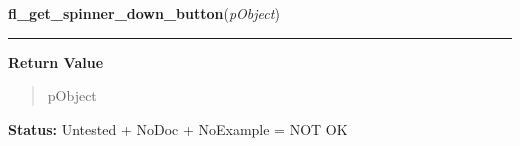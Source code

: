     \vspace{0.5ex}

\hspace{.8\funcindent}\begin{boxedminipage}{\funcwidth}

    \raggedright \textbf{fl\_get\_spinner\_down\_button}(\textit{pObject})

    \vspace{-1.5ex}

    \rule{\textwidth}{0.5\fboxrule}
\setlength{\parskip}{2ex}
\setlength{\parskip}{1ex}
      \textbf{Return Value}
    \vspace{-1ex}

      \begin{quote}
      pObject

      \end{quote}

\textbf{Status:} Untested + NoDoc + NoExample = NOT OK



    \end{boxedminipage}

    \label{xformslib:library:fl_create_tabfolder}

    \vspace{0.5ex}

